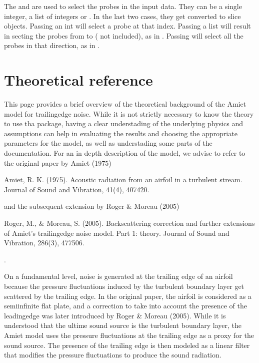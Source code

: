 \documentclass[letterpaper,10pt,english]{sphinxmanual}
\begin{document}
\sphinxAtStartPar
The  and  are used to select the probes in the input data. They can be a single integer, a list of integers or . In the last two cases, they get converted to slice objects. Passing an int will select a probe at that index. Passing a list \sphinxcode{\sphinxupquote{{[}a,b{]}}} will result in secting the probes from  to  ( not included), as in . Passing  will select all the probes in that direction, as in .

\sphinxstepscope


\chapter{Theoretical reference}
\label{\detokenize{theory:theoretical-reference}}\label{\detokenize{theory::doc}}
\sphinxAtStartPar
This page provides a brief overview of the theoretical background of the Amiet model for trailing\sphinxhyphen{}edge noise. While it is not strictly necessary to know the theory to use tha package, having a clear understading of the underlying physics and assumptions can help in evaluating the results and choosing the appropriate parameters for the model, as well as understading some parts of the documentation. For an in depth description of the model, we advise to refer to the original paper by Amiet (1975) %
\begin{footnote}[1]\sphinxAtStartFootnote
Amiet, R. K. (1975). Acoustic radiation from an airfoil in a
turbulent stream. Journal of Sound and Vibration, 41(4), 407\sphinxhyphen{}420.
%
\end{footnote} and the subsequent extension by Roger \& Moreau (2005) %
\begin{footnote}[2]\sphinxAtStartFootnote
Roger, M., \& Moreau, S. (2005). Back\sphinxhyphen{}scattering correction and
further extensions of Amiet’s trailing\sphinxhyphen{}edge noise model.
Part 1: theory. Journal of Sound and Vibration, 286(3), 477\sphinxhyphen{}506.
%
\end{footnote}.

\sphinxAtStartPar
On a fundamental level, noise is generated at the trailing edge of an airfoil because the pressure fluctuations induced by the turbulent boundary layer get  scattered by the trailing edge. In the original paper, the airfoil is considered as a semi\sphinxhyphen{}infinite flat plate, and a correction to take into account the presence of the leading\sphinxhyphen{}edge was later introduced by Roger \& Moreau (2005). While it is understood that the ultime sound source is the turbulent boundary layer, the Amiet model uses the pressure fluctuations at the trailing edge as a proxy for the sound source. The presence of the trailing edge is then modeled as a linear filter that modifies the pressure fluctuations to produce the sound radiation.
\end{document}

